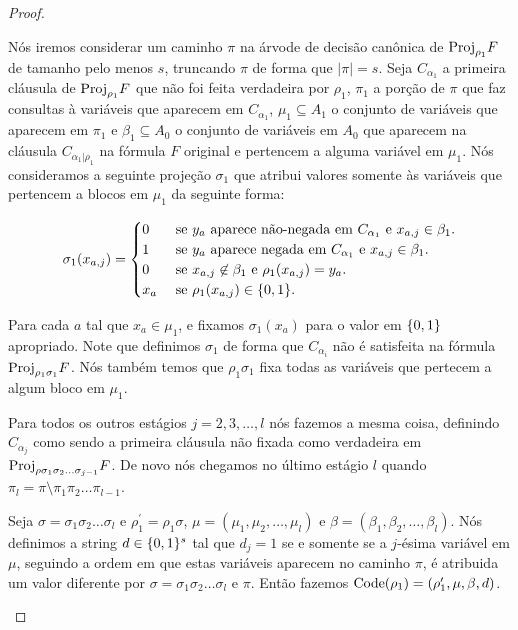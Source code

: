 \begin{proof}
\begin{enumerate}
	Nós iremos considerar um caminho $\pi$ na árvode de decisão canônica de $\text{Proj}_{\rho_{1}}F$ de tamanho pelo menos $s$, truncando $\pi$ de forma que $\lvert \pi \rvert = s$. Seja $C_{\alpha_{1}}$ a primeira cláusula de $\text{Proj}_{\rho_{1}}F$ que não foi feita verdadeira por $\rho_{1}$, $\pi_{1}$ a porção de $\pi$ que faz consultas à variáveis que aparecem em $C_{\alpha_{1}}$, $\mu_{1} \subseteq A_{1}$ o conjunto de variáveis que aparecem em $\pi_{1}$ e  $\beta_{1} \subseteq A_{0}$ o conjunto de variáveis em $A_{0}$ que aparecem na cláusula $C_{\alpha_{1} \lvert \rho_{1}}$ na fórmula $F$ original e pertencem a alguma variável em $\mu_{1}$. Nós consideramos a seguinte projeção $\sigma_{1}$ que atribui valores somente às variáveis que pertencem a blocos em $\mu_{1}$ da seguinte forma:
	
	\begin{equation} \label{sigma_i_def}
		\sigma_{1}(x_{a, j}) = \begin{cases}
					      	0 & \text{ se } y_{a} \text{ aparece não-negada em } C_{\alpha_{1}} \text{ e } x_{a, j} \in \beta_{1}. \\
					      	1 & \text{ se } y_{a} \text{ aparece negada em } C_{\alpha_{1}} \text{ e } x_{a, j} \in \beta_{1}. \\
					      	0 & \text{ se } x_{a, j} \not\in \beta_{1} \text{ e } \rho_{1}(x_{a, j}) = y_{a}. \\
					      	x_{a} & \text{ se } \rho_{1}(x_{a, j}) \in \{0, 1\}.
					      \end{cases}
	\end{equation}
	
	Para cada $a$ tal que $x_{a} \in \mu_{1}$, e fixamos $\sigma_{1}(x_{a})$ para o valor em $\{0, 1\}$ apropriado. Note que definimos $\sigma_{1}$ de forma que $C_{\alpha_{i}}$ não é satisfeita na fórmula $\text{Proj}_{\rho_{1}\sigma_{1}}F$. Nós também temos que $\rho_{1}\sigma_{1}$ fixa todas as variáveis que pertecem a algum bloco em $\mu_{1}$.
	
	Para todos os outros estágios $j = 2, 3, \dots, l$ nós fazemos a mesma coisa, definindo $C_{\alpha_{j}}$ como sendo a primeira cláusula não fixada como verdadeira em $\text{Proj}_{\rho\sigma_{1}\sigma_{2}\dots\sigma_{j - 1}}F$. De novo nós chegamos no último estágio $l$ quando $\pi_{l} = \pi \setminus \pi_{1}\pi_{2}\dots\pi_{l - 1}$.
	
	Seja $\sigma = \sigma_{1}\sigma_{2}\dots\sigma_{l}$ e $\rho_{1}^{\prime} = \rho_{1}\sigma$, $\mu = (\mu_{1}, \mu_{2}, \dots, \mu_{l})$ e $\beta = (\beta_{1}, \beta_{2}, \dots, \beta_{l})$. Nós definimos a string $d \in \{0, 1\}^{s}$ tal que $d_{j} = 1$ se e somente se a $j$-ésima variável em $\mu$, seguindo a ordem em que estas variáveis aparecem no caminho $\pi$, é atribuida um valor diferente por $\sigma = \sigma_{1}\sigma_{2}\dots\sigma_{l}$ e $\pi$. Então fazemos $\text{Code}(\rho_{1}) = (\rho_{1}^{\prime}, \mu, \beta, d)$.
	

\end{enumerate}
\end{proof}
